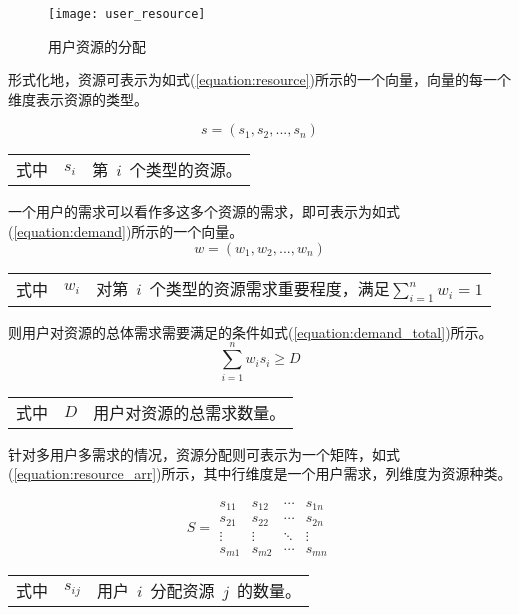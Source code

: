 \begin{figure}[htbp]
    \centering
    \texttt{[image: user\_resource]}
    \caption{用户资源的分配}\label{figure:user_resource}
    \vspace{-1em}
\end{figure}

形式化地，资源可表示为如式(\ref{equation:resource})所示的一个向量，向量的每一个维度表示资源的类型。

\begin{equation}\label{equation:resource}
s = (s_1, s_2, ..., s_n)
\end{equation}
\begin{tabularx}{\textwidth}{@{}l@{\quad}l@{\pozhehao }X@{}}
    式中
    & $s_i$ & 第~$i$~个类型的资源。
\end{tabularx}\vspace{\wordsep}

一个用户的需求可以看作多这多个资源的需求，即可表示为如式(\ref{equation:demand})所示的一个向量。
\begin{equation}\label{equation:demand}
w = (w_1, w_2, ..., w_n)
\end{equation}
\begin{tabularx}{\textwidth}{@{}l@{\quad}l@{\pozhehao }X@{}}
    式中
    & $w_i$ & 对第~$i$~个类型的资源需求重要程度，满足$\sum\limits_{i = 1}^n {{w_i}}  = 1$
\end{tabularx}\vspace{\wordsep}

则用户对资源的总体需求需要满足的条件如式(\ref{equation:demand_total})所示。
\begin{equation}\label{equation:demand_total}
\sum\limits_{i = 1}^n {{w_i}{s_i}}  \ge D
\end{equation}
\begin{tabularx}{\textwidth}{@{}l@{\quad}l@{\pozhehao }X@{}}
    式中
    & $D$ & 用户对资源的总需求数量。
\end{tabularx}\vspace{\wordsep}

针对多用户多需求的情况，资源分配则可表示为一个矩阵，如式(\ref{equation:resource_arr})所示，其中行维度是一个用户需求，列维度为资源种类。

\begin{equation}\label{equation:resource_arr}
S = \begin{array}{*{20}{c}}
{{s_{11}}}&{{s_{12}}}& \cdots &{{s_{1n}}}\\
{{s_{21}}}&{{s_{22}}}& \cdots &{{s_{2n}}}\\
\vdots & \vdots & \ddots & \vdots \\
{{s_{m1}}}&{{s_{m2}}}& \cdots &{{s_{mn}}}
\end{array}
\end{equation}
\begin{tabularx}{\textwidth}{@{}l@{\quad}l@{\pozhehao }X@{}}
    式中
    & $s_{ij}$ & 用户~$i$~分配资源~$j$~的数量。
\end{tabularx}\vspace{\wordsep}

